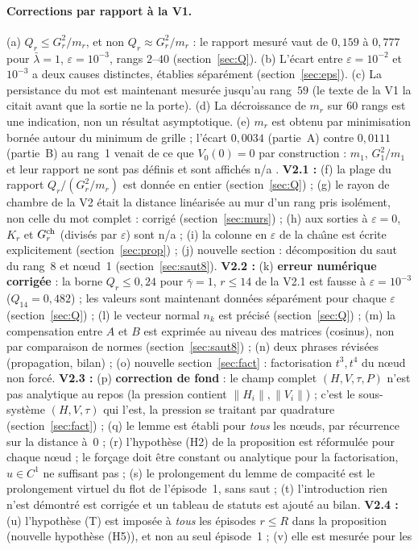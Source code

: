 \documentclass[11pt,a4paper]{article}
\theoremstyle{remark}
\begin{document}
\paragraph{Corrections par rapport \`a la V1.}
(a) $Q_r\le G_r^2/m_r$, et non $Q_r\approx G_r^2/m_r$ : le rapport mesur\'e vaut de $0{,}159$ \`a $0{,}777$ pour $\bar\lambda=1$, $\varepsilon=10^{-3}$, rangs $2$--$40$ (section~\ref{sec:Q}). (b) L'\'ecart entre $\varepsilon=10^{-2}$ et $10^{-3}$ a deux causes distinctes, \'etablies s\'epar\'ement (section~\ref{sec:eps}). (c) La persistance du mot est maintenant mesur\'ee jusqu'au rang~$59$ (le texte de la V1 la citait avant que la sortie ne la porte). (d) La d\'ecroissance de $m_r$ sur $60$ rangs est une indication, non un r\'esultat asymptotique. (e) $m_r$ est obtenu par minimisation born\'ee autour du minimum de grille ; l'\'ecart $0{,}0034$ (partie~A) contre $0{,}0111$ (partie~B) au rang~1 venait de ce que $V_0(0)=0$ par construction : $m_1$, $G_1^2/m_1$ et leur rapport ne sont pas d\'efinis et sont affich\'es \og n/a \fg. \textbf{V2.1 :} (f) la plage du rapport $Q_r/(G_r^2/m_r)$ est donn\'ee en entier (section~\ref{sec:Q}) ; (g) le \og rayon de chambre \fg{} de la V2 \'etait la distance lin\'earis\'ee au mur d'un rang pris isol\'ement, non celle du mot complet : corrig\'e (section~\ref{sec:murs}) ; (h) aux sorties \`a $\varepsilon=0$, $K_r$ et $G_r^{\rm ch}$ (divis\'es par $\varepsilon$) sont \og n/a \fg{} ; (i) la colonne en $\varepsilon$ de la cha\^{\i}ne est \'ecrite explicitement (section~\ref{sec:prop}) ; (j) nouvelle section : d\'ecomposition du saut du rang~8 et n\oe ud~1 (section~\ref{sec:saut8}). \textbf{V2.2 :} (k) \textbf{erreur num\'erique corrig\'ee} : la borne \og $Q_r\le0{,}24$ pour $\bar\gamma=1$, $r\le14$ \fg{} de la V2.1 est fausse \`a $\varepsilon=10^{-3}$ ($Q_{14}=0{,}482$) ; les valeurs sont maintenant donn\'ees s\'epar\'ement pour chaque $\varepsilon$ (section~\ref{sec:Q}) ; (l) le vecteur normal $n_k$ est pr\'ecis\'e (section~\ref{sec:Q}) ; (m) la compensation entre $A$ et $B$ est exprim\'ee au niveau des matrices (cosinus), non par comparaison de normes (section~\ref{sec:saut8}) ; (n) deux phrases r\'evis\'ees (propagation, bilan) ; (o) nouvelle section~\ref{sec:fact} : factorisation $t^3,t^4$ du n\oe ud non forc\'e. \textbf{V2.3 :} (p) \textbf{correction de fond} : le champ complet $(H,V,\tau,P)$ n'est pas analytique au repos (la pression contient $\lVert H_i\rVert,\lVert V_i\rVert$) ; c'est le sous-syst\`eme $(H,V,\tau)$ qui l'est, la pression se traitant par quadrature (section~\ref{sec:fact}) ; (q) le lemme est \'etabli pour \emph{tous} les n\oe uds, par r\'ecurrence sur la distance \`a~0 ; (r) l'hypoth\`ese (H2) de la proposition est r\'eformul\'ee pour chaque n\oe ud ; le for\c{c}age doit \^etre constant ou analytique pour la factorisation, $u\in C^1$ ne suffisant pas ; (s) le prolongement du lemme de compacit\'e est le prolongement virtuel du flot de l'\'episode~1, sans saut ; (t) l'introduction \og rien n'est d\'emontr\'e \fg{} est corrig\'ee et un tableau de statuts est ajout\'e au bilan. \textbf{V2.4 :} (u) l'hypoth\`ese (T) est impos\'ee \`a \emph{tous} les \'episodes $r\le R$ dans la proposition (nouvelle hypoth\`ese (H5)), et non au seul \'episode~1 ; (v) elle est mesur\'ee pour les 
\end{document}
